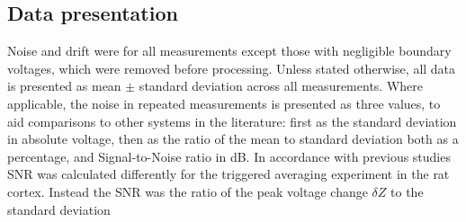 \subsection{Data presentation}

Noise and drift were for all measurements except those with negligible boundary voltages, which were removed before processing. Unless stated otherwise, all data is presented as mean $\pm$ standard deviation across all measurements. Where applicable, the noise in repeated measurements is presented as three values, to aid comparisons to other systems in the literature: first as the standard deviation in absolute voltage, then as the ratio of the mean to standard deviation both as a percentage, and Signal-to-Noise ratio in dB. In accordance with previous studies SNR was calculated differently for the triggered averaging experiment in the rat cortex. Instead the SNR was the ratio of the peak voltage change $\delta Z$ to the standard deviation  \cite{Oh2011} 
